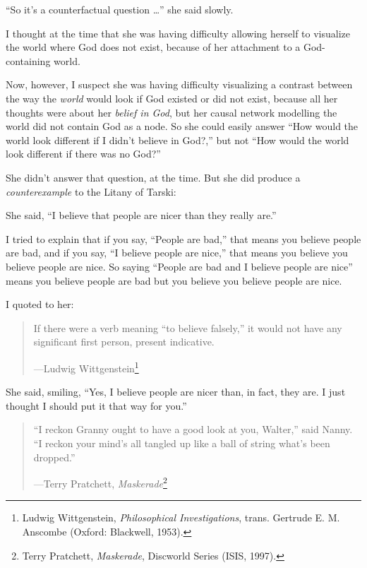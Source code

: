 {
 ``So it's a counterfactual
question \ldots'' she said slowly.}

{
 I thought at the time that she was having difficulty allowing
herself to visualize the world where God does not exist, because of her
attachment to a God-containing world.}

{
 Now, however, I suspect she was having difficulty visualizing a
contrast between the way the \textit{world} would look if God existed
or did not exist, because all her thoughts were about her
\textit{belief in God}, but her causal network modelling the world did
not contain God as a node. So she could easily answer
``How would the world look different if I
didn't believe in God?,'' but not
``How would the world look different if there was no
God?''}

{
 She didn't answer that question, at the time. But
she did produce a \textit{counterexample} to the Litany of Tarski:}

{
 She said, ``I believe that people are nicer than
they really are.''}

{
 I tried to explain that if you say, ``People are
bad,'' that means you believe people are bad, and if
you say, ``I believe people are
nice,'' that means you believe you believe people are
nice. So saying ``People are bad and I believe people
are nice'' means you believe people are bad but you
believe you believe people are nice.}

{
 I quoted to her:}

\begin{quote}
{
 If there were a verb meaning ``to believe
falsely,'' it would not have any significant first
person, present indicative.}

{\raggedleft
 {}---Ludwig Wittgenstein\footnote{Ludwig Wittgenstein, \textit{Philosophical Investigations},
trans. Gertrude E. M. Anscombe (Oxford: Blackwell, 1953).}
\par}
\end{quote}


{
 She said, smiling, ``Yes, I believe people are
nicer than, in fact, they are. I just thought I should put it that way
for you.''}

\begin{quote}
{
 ``I reckon Granny ought to have a good look at
you, Walter,'' said Nanny. ``I
reckon your mind's all tangled up like a ball of string
what's been dropped.''}

{\raggedleft
 {}---Terry Pratchett, \textit{Maskerade}\footnote{Terry Pratchett, \textit{Maskerade}, Discworld Series (ISIS,
1997).}
\par}
\end{quote}


